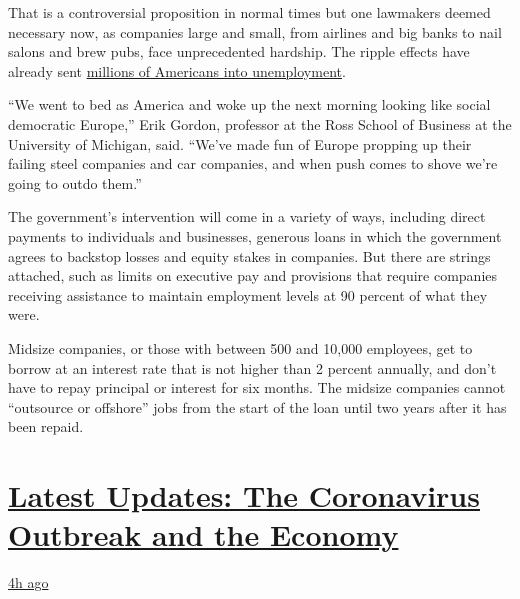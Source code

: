That is a controversial proposition in normal times but one lawmakers
deemed necessary now, as companies large and small, from airlines and
big banks to nail salons and brew pubs, face unprecedented hardship. The
ripple effects have already sent
\href{https://www.nytimes.com/2020/03/26/business/economy/coronavirus-unemployment-claims.html}{millions
of Americans into unemployment}.

``We went to bed as America and woke up the next morning looking like
social democratic Europe,'' Erik Gordon, professor at the Ross School of
Business at the University of Michigan, said. ``We've made fun of Europe
propping up their failing steel companies and car companies, and when
push comes to shove we're going to outdo them.''

The government's intervention will come in a variety of ways, including
direct payments to individuals and businesses, generous loans in which
the government agrees to backstop losses and equity stakes in companies.
But there are strings attached, such as limits on executive pay and
provisions that require companies receiving assistance to maintain
employment levels at 90 percent of what they were.

Midsize companies, or those with between 500 and 10,000 employees, get
to borrow at an interest rate that is not higher than 2 percent
annually, and don't have to repay principal or interest for six months.
The midsize companies cannot ``outsource or offshore'' jobs from the
start of the loan until two years after it has been repaid.

\hypertarget{latest-updates-the-coronavirus-outbreak-and-the-economy}{%
\section{\texorpdfstring{\href{https://www.nytimes.com/live/2020/08/17/business/stock-market-today-coronavirus?action=click\&pgtype=Article\&state=default\&region=MAIN_CONTENT_1\&context=storylines_live_updates}{Latest
Updates: The Coronavirus Outbreak and the
Economy}}{Latest Updates: The Coronavirus Outbreak and the Economy}}\label{latest-updates-the-coronavirus-outbreak-and-the-economy}}

\href{https://www.nytimes.com/live/2020/08/17/business/stock-market-today-coronavirus?action=click\&pgtype=Article\&state=default\&region=MAIN_CONTENT_1\&context=storylines_live_updates\#robinhood-a-stock-trading-app-is-valued-at-11-2-billion-in-its-latest-funding-round}{4h
ago}

